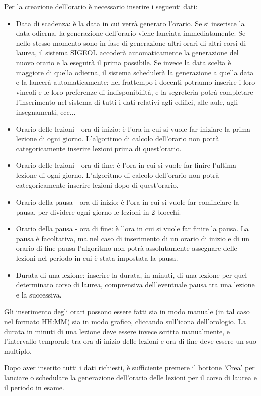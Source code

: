 \documentclass[11pt,a4paper]{article}
\begin{document}
Per la creazione dell'orario è necessario inserire i seguenti dati:
\begin{itemize}
 \item Data di scadenza: è la data in cui verrà generaro l'orario. Se si inserisce la data odierna, la generazione dell'orario viene lanciata immediatamente. Se nello stesso momento sono in fase di generazione altri orari di altri corsi di laurea, il sistema SIGEOL accoderà automaticamente la generazione del nuovo orario e la eseguirà il prima possibile. Se invece la data scelta è maggiore di quella odierna, il sistema schedulerà la generazione a quella data e la lancerà automaticamente: nel frattempo i docenti potranno inserire i loro vincoli e le loro preferenze di indisponibilità, e la segreteria potrà completare l'inserimento nel sistema di tutti i dati relativi agli edifici, alle aule, agli insegnamenti, ecc...
 \item Orario delle lezioni - ora di inizio: è l'ora in cui si vuole far iniziare la prima lezione di ogni giorno. L'algoritmo di calcolo dell'orario non potrà categoricamente inserire lezioni prima di quest'orario.
 \item Orario delle lezioni - ora di fine: è l'ora in cui si vuole far finire l'ultima lezione di ogni giorno. L'algoritmo di calcolo dell'orario non potrà categoricamente inserire lezioni dopo di quest'orario.
 \item Orario della pausa - ora di inizio: è l'ora in cui si vuole far cominciare la pausa, per dividere ogni giorno le lezioni in 2 blocchi.
 \item Orario della pausa - ora di fine: è l'ora in cui si vuole far finire la pausa. La pausa è facoltativa, ma nel caso di inserimento di un orario di inizio e di un orario di fine pausa l'algoritmo non potrà assolutamente assegnare delle lezioni nel periodo in cui è stata impostata la pausa.
 \item Durata di una lezione: inserire la durata, in minuti, di una lezione per quel determinato corso di laurea, comprensiva dell'eventuale pausa tra una lezione e la successiva.
\end{itemize}
Gli inserimento degli orari possono essere fatti sia in modo manuale (in tal caso nel formato HH:MM) sia in modo grafico, cliccando sull'icona dell'orologio.
La durata in minuti di una lezione deve essere invece scritta manualmente, e l'intervallo temporale tra ora di inizio delle lezioni e ora di fine deve essere un suo multiplo.

Dopo aver inserito tutti i dati richiesti, è sufficiente premere il bottone 'Crea' per lanciare o schedulare la generazione dell'orario delle lezioni per il corso di laurea e il periodo in esame.
\end{document}
